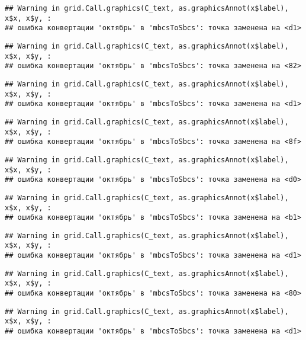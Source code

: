 \documentclass[
]{article}
\begin{document}
\begin{verbatim}
## Warning in grid.Call.graphics(C_text, as.graphicsAnnot(x$label), x$x, x$y, :
## ошибка конвертации 'октябрь' в 'mbcsToSbcs': точка заменена на <d1>
\end{verbatim}

\begin{verbatim}
## Warning in grid.Call.graphics(C_text, as.graphicsAnnot(x$label), x$x, x$y, :
## ошибка конвертации 'октябрь' в 'mbcsToSbcs': точка заменена на <82>
\end{verbatim}

\begin{verbatim}
## Warning in grid.Call.graphics(C_text, as.graphicsAnnot(x$label), x$x, x$y, :
## ошибка конвертации 'октябрь' в 'mbcsToSbcs': точка заменена на <d1>
\end{verbatim}

\begin{verbatim}
## Warning in grid.Call.graphics(C_text, as.graphicsAnnot(x$label), x$x, x$y, :
## ошибка конвертации 'октябрь' в 'mbcsToSbcs': точка заменена на <8f>
\end{verbatim}

\begin{verbatim}
## Warning in grid.Call.graphics(C_text, as.graphicsAnnot(x$label), x$x, x$y, :
## ошибка конвертации 'октябрь' в 'mbcsToSbcs': точка заменена на <d0>
\end{verbatim}

\begin{verbatim}
## Warning in grid.Call.graphics(C_text, as.graphicsAnnot(x$label), x$x, x$y, :
## ошибка конвертации 'октябрь' в 'mbcsToSbcs': точка заменена на <b1>
\end{verbatim}

\begin{verbatim}
## Warning in grid.Call.graphics(C_text, as.graphicsAnnot(x$label), x$x, x$y, :
## ошибка конвертации 'октябрь' в 'mbcsToSbcs': точка заменена на <d1>
\end{verbatim}

\begin{verbatim}
## Warning in grid.Call.graphics(C_text, as.graphicsAnnot(x$label), x$x, x$y, :
## ошибка конвертации 'октябрь' в 'mbcsToSbcs': точка заменена на <80>
\end{verbatim}

\begin{verbatim}
## Warning in grid.Call.graphics(C_text, as.graphicsAnnot(x$label), x$x, x$y, :
## ошибка конвертации 'октябрь' в 'mbcsToSbcs': точка заменена на <d1>
\end{verbatim}
\end{document}
